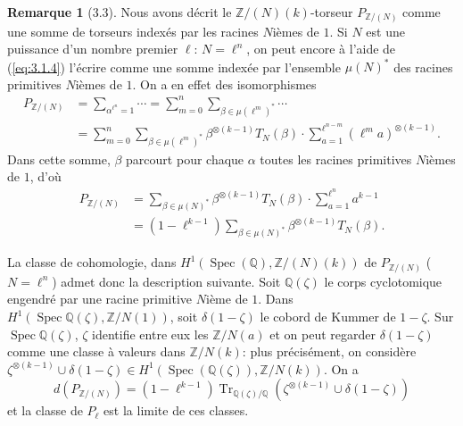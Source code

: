 \documentclass[12pt,a4paper]{article}
\theoremstyle{plain}
\theoremstyle{definition}
\newtheorem{remark}[theorem]{Remarque}
\theoremstyle{remark}
\DeclareMathOperator{\Spec}{Spec}
\providecommand{\Spec}{\operatorname{Spec}}
\providecommand{\Tr}{\operatorname{Tr}}
\begin{document}
\begin{remark}[3.3]\label{rem:3.3}
Nous avons d\'ecrit le $\mathbb{Z}/(N)(k)$-torseur $P_{\mathbb{Z}/(N)}$ comme une somme
de torseurs index\'es par les racines $N$i\`emes de $1$. Si $N$ est une puissance d'un
nombre premier $\ell$: $N = \ell^n$, on peut encore \`a l'aide de (\ref{eq:3.1.4}) l'\'ecrire
comme une somme index\'ee par l'ensemble $\mu(N)^*$ des racines primitives $N$i\`emes de
$1$. On a en effet des isomorphismes
\begin{align*}
P_{\mathbb{Z}/(N)} &= \sum_{\alpha^{\ell^n}=1} \cdots =
\sum_{m=0}^{n} \sum_{\beta \in \mu(\ell^m)^*} \cdots \\
&= \sum_{m=0}^{n} \sum_{\beta \in \mu(\ell^m)^*} \beta^{\otimes(k-1)} T_N(\beta) \cdot
\sum_{a=1}^{\ell^{n-m}} (\ell^m a)^{\otimes(k-1)}.
\end{align*}
Dans cette somme, $\beta$ parcourt pour chaque $\alpha$ toutes les racines primitives
$N$i\`emes de $1$, d'o\`u
\begin{align*}
P_{\mathbb{Z}/(N)} &= \sum_{\beta \in \mu(N)^*} \beta^{\otimes(k-1)} T_N(\beta) \cdot
\sum_{a=1}^{\ell^n} a^{k-1} \\
&= (1-\ell^{k-1}) \sum_{\beta \in \mu(N)^*} \beta^{\otimes(k-1)} T_N(\beta).
\end{align*}

La classe de cohomologie, dans $H^1(\Spec(\mathbb{Q}), \mathbb{Z}/(N)(k))$ de
$P_{\mathbb{Z}/(N)}$ ($N = \ell^n$) admet donc la description suivante. Soit
$\mathbb{Q}(\zeta)$ le corps cyclotomique engendr\'e par une racine primitive
$N$i\`eme de $1$. Dans $H^1(\Spec \mathbb{Q}(\zeta), \mathbb{Z}/N(1))$, soit
$\delta(1-\zeta)$ le cobord de Kummer de $1-\zeta$. Sur $\Spec \mathbb{Q}(\zeta)$,
$\zeta$ identifie entre eux les $\mathbb{Z}/N(a)$ et on peut regarder $\delta(1-\zeta)$
comme une classe \`a valeurs dans $\mathbb{Z}/N(k)$: plus pr\'ecis\'ement, on consid\`ere
$\zeta^{\otimes(k-1)} \cup \delta(1-\zeta) \in H^1(\Spec(\mathbb{Q}(\zeta)),
\mathbb{Z}/N(k))$. On a
\[
d(P_{\mathbb{Z}/(N)}) = (1-\ell^{k-1}) \Tr_{\mathbb{Q}(\zeta)/\mathbb{Q}}
(\zeta^{\otimes(k-1)} \cup \delta(1-\zeta))
\]
et la classe de $P_\ell$ est la limite de ces classes.
\end{remark}
\end{document}
